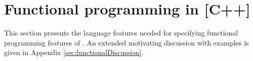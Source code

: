 \section{Functional programming in \lang{} [C++]}
\label{sec:functional}

This section presents the language features needed for specifying functional programming features of \lang{}. An extended motivating discussion with examples is given in Appendix \ref{sec:functionalDiscussion}.



